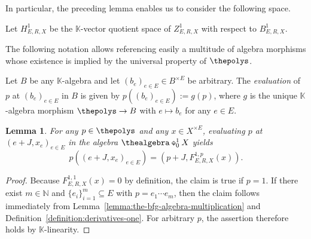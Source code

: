 \documentclass[10pt,a4paper]{amsart}
\numberwithin{equation}{section}
\newtheorem{Lemma}[Theorem]{Lemma}
\newcommand{\diamondplus}{\mathbin{\ooalign{\hfil$\diamond$\hfil\cr\hfil$\scriptscriptstyle+$\hfil\cr}}}
\newcommand{\HSalgebraconstructdeform}[4]{#2\diamondplus^{#1}_{#4}#3}
\newcommand{\HSuacocycles}[4]{Z^{#1}_{#2,#3,#4}}
\newcommand{\HSuacoboundaries}[4]{B^{#1}_{#2,#3,#4}}
\newcommand{\HSuacohomology}[4]{H^{#1}_{#2,#3,#4}}
\newcommand{\HSuafuncxx}[6]{F^{#1,#5}_{#2,#3,#4}(#6)}
\newcommand{\pint}{\mathbb{N}}
\newcommand{\fromto}[2]{#1 \to #2}
\newcommand{\Sdirectproduct}{\times}
\newcommand{\thegens}{E}
\newcommand{\therels}{R}
\newcommand{\theideal}{J}
\newcommand{\thefield}{\mathbb{K}}
\newcommand{\themodule}{X}
\begin{document}
{In particular, the preceding lemma enables us to consider the following space.
\begin{Definition}
  \label{definition:hochschild-particular-one-cohomology}
  Let $\HSuacohomology{1}{\thegens}{\therels}{\themodule}$ be the $\thefield$-vector quotient space of $\HSuacocycles{1}{\thegens}{\therels}{\themodule}$ with respect to $\HSuacoboundaries{1}{\thegens}{\therels}{\themodule}$.
\end{Definition}
  The following notation allows referencing easily a multitude of algebra morphisms whose existence is implied by the universal property of $\thepolys$.
\begin{Notation}
  \label{notation:evaluation_of_polynomials}
  \newcommand{\anyalgebra}{B}
  \newcommand{\anytuple}{b}
  \newcommand{\anygen}{e}
  \newcommand{\anytuplex}[1]{\anytuple_{#1}}
  \newcommand{\anypoly}{p}
  \newcommand{\themorph}{g}
  Let  $\anyalgebra$ be any $\thefield$-algebra and let $(\anytuplex{\anygen})_{\anygen\in\thegens}\in \anyalgebra^{\Sdirectproduct \thegens}$ be arbitrary. The \emph{evaluation} of $\anypoly$ at $(\anytuplex{\anygen})_{\anygen\in\thegens}$ in $\anyalgebra$ is given by $\anypoly((\anytuplex{\anygen})_{\anygen\in\thegens}):= \themorph(\anypoly)$, where  $\themorph$ is the unique $\thefield$-algebra morphism  $\fromto{\thepolys}{\anyalgebra}$ with  $\anygen\mapsto\anytuplex{\anygen}$ for any $\anygen\in\thegens$.
\end{Notation}
{
        \newcommand{\somepoly}{p}
        \newcommand{\somegen}{e}
        \newcommand{\thetuple}{x}
        \newcommand{\thetuplex}[1]{\thetuple_{#1}}
  \begin{Lemma}
    \label{lemma:hochschild-particular-one-cohomology-helper}
      {
        For any $\somepoly\in\thepolys$ and any $\thetuple\in \themodule^{\Sdirectproduct \thegens}$, evaluating $\somepoly$ at $(\somegen+\theideal,\thetuplex{\somegen})_{\somegen\in\thegens}$ in the algebra $\HSalgebraconstructdeform{1}{\thealgebra}{\themodule}{0}$ yields
        \[
          \somepoly((\somegen+\theideal,\thetuplex{\somegen})_{\somegen\in\thegens})=(\somepoly+\theideal,\HSuafuncxx{1}{\thegens}{\therels}{\themodule}{\somepoly}{\thetuple}).
        \]
        }
  \end{Lemma}
  \begin{proof}
    \newcommand{\somenumber}{m}
    \newcommand{\indi}{i}
    \newcommand{\thee}[1]{e_{#1}}
Because $\HSuafuncxx{1}{\thegens}{\therels}{\themodule}{1}{\thetuple}=0$ by definition, the claim is true if $\somepoly=1$. If there exist $\somenumber\in\pint$ and $\{\thee{\indi}\}_{\indi=1}^\somenumber\subseteq \thegens$ with $\somepoly=\thee{1}\cdots\thee{\somenumber}$, then the claim follows immediately from Lem\-ma~\ref{lemma:the-bfg-algebra-multiplication} and Definition~\ref{definition:derivatives-one}. For arbitrary $\somepoly$, the assertion therefore holds by $\thefield$-linearity.
  \end{proof}
}

}
\end{document}
